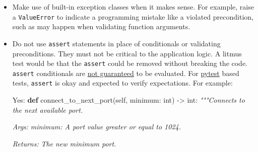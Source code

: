 \documentclass[
]{article}
\newenvironment{Shaded}{}{}
\newcommand{\BuiltInTok}[1]{\textcolor[rgb]{0.00,0.50,0.00}{#1}}
\newcommand{\CommentTok}[1]{\textcolor[rgb]{0.38,0.63,0.69}{\textit{#1}}}
\newcommand{\KeywordTok}[1]{\textcolor[rgb]{0.00,0.44,0.13}{\textbf{#1}}}
\newcommand{\NormalTok}[1]{#1}
\newcommand{\OperatorTok}[1]{\textcolor[rgb]{0.40,0.40,0.40}{#1}}
\newcommand{\VariableTok}[1]{\textcolor[rgb]{0.10,0.09,0.49}{#1}}
\begin{document}
\begin{itemize}
\item
  Make use of built-in exception classes when it makes sense. For
  example, raise a \texttt{ValueError} to indicate a programming mistake
  like a violated precondition, such as may happen when validating
  function arguments.
\item
  Do not use \texttt{assert} statements in place of conditionals or
  validating preconditions. They must not be critical to the application
  logic. A litmus test would be that the \texttt{assert} could be
  removed without breaking the code. \texttt{assert} conditionals are
  \href{https://docs.python.org/3/reference/simple_stmts.html\#the-assert-statement}{not
  guaranteed} to be evaluated. For \href{https://pytest.org}{pytest}
  based tests, \texttt{assert} is okay and expected to verify
  expectations. For example:

\begin{samepage}
  \begin{Shaded}
\begin{Highlighting}[]
\NormalTok{Yes:}
  \KeywordTok{def}\NormalTok{ connect\_to\_next\_port(}\VariableTok{self}\NormalTok{, minimum: }\BuiltInTok{int}\NormalTok{) }\OperatorTok{{-}\textgreater{}} \BuiltInTok{int}\NormalTok{:}
    \CommentTok{"""Connects to the next available port.}

\CommentTok{    Args:}
\CommentTok{      minimum: A port value greater or equal to 1024.}

\CommentTok{    Returns:}
\CommentTok{      The new minimum port.}


\end{Highlighting}
\end{Shaded}
\end{samepage}
\end{itemize}
\end{document}

